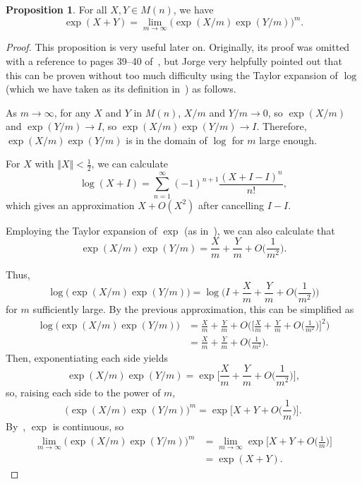 \documentclass[12pt]{article}
\newcommand{\V}{\Vert}
\theoremstyle{definition}
\newtheorem{prop}[them]{Proposition}
\theoremstyle{definition}
\theoremstyle{definition}
\theoremstyle{definition}
\theoremstyle{definition}
\theoremstyle{definition}
\theoremstyle{definition}
\theoremstyle{definition}
\begin{document}
\begin{prop}\label{prop:weirdexp}
For all $X, Y \in M(n)$, we have
\[
    \exp(X+Y) = \lim_{m\to\infty} {\big(\exp(X/m)\exp(Y/m)\big)}^m.
\]
\end{prop}
\begin{proof}
\par{This proposition is very useful later on.
Originally, its proof was omitted with a reference
to pages 39--40 of~\cite{Hall}, but Jorge very helpfully
pointed out that this can be proven without too
much difficulty using the Taylor expansion of
$\log$ (which we have taken as its definition
in~) as follows.} 

\par{As $m \to \infty$, for any $X$ and $Y$ in
$M(n)$, $X/m$ and $Y/m \to 0$, so $\exp(X/m)$ and
$\exp(Y/m) \to I$, so $\exp(X/m)\exp(Y/m) \to I$.
Therefore, $\exp(X/m)\exp(Y/m)$ is in the domain
of $\log$ for $m$ large enough.} 

\par{For $X$ with $\V X \V < \frac{1}{2}$, we can
calculate
\[ 
\log(X + I) = \sum_{n=1}^{\infty}(-1)^{n+1}\frac{(X + I - I)^n}{n!},
\] 
which gives an approximation $X + O(X^2)$ after
cancelling $I - I$.} 

\par{Employing the Taylor expansion of $\exp$ (as
in~), we can also calculate that 
\[\exp(X/m)\exp(Y/m) = \frac{X}{m} + \frac{Y}{m} +
O\Big(\frac{1}{m^2}\Big).\]}

\par{Thus, 
\[
    \log\big(\exp(X/m)\exp(Y/m)\big) = \log\Big(I + \frac{X}{m} + \frac{Y}{m} + O\Big(\frac{1}{m^2}\Big)\Big)
\] 
for $m$ sufficiently large. By the previous
approximation, this can be simplified as
\[
\begin{aligned}
    \log\big(\exp(X/m)\exp(Y/m)\big) & = \frac{X}{m} + \frac{Y}{m} + O\Big(\Big[\frac{X}{m} + \frac{Y}{m} + O\Big(\frac{1}{m^2}\Big)\Big]^2\Big) \\
    & = \frac{X}{m} + \frac{Y}{m} + O\Big(\frac{1}{m^2}\Big).
\end{aligned}
\] 
Then, exponentiating each side yields
\[
    \exp(X/m)\exp(Y/m) = \exp\Big[\frac{X}{m} + \frac{Y}{m} + O\Big(\frac{1}{m^2}\Big)\Big],
\] 
so, raising each side to the power of $m$,
\[
    \big(\exp(X/m)\exp(Y/m)\big)^m = \exp\Big[X + Y + O\Big(\frac{1}{m}\Big)\Big].
\] 
By~, $\exp$ is continuous, so
\[
\begin{aligned}
    \lim_{m\to\infty}\Big(\exp(X/m)\exp(Y/m)\Big)^m & = \lim_{m\to\infty}\exp\Big[X + Y + O\Big(\frac{1}{m}\Big)\Big] \\
    & = \exp(X + Y).
\end{aligned}
\]}
\end{proof}
\end{document}
